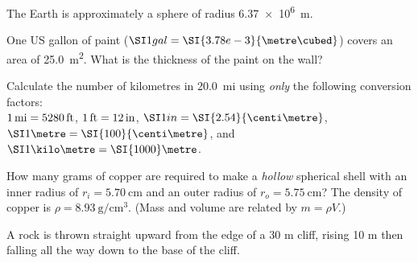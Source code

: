 \documentclass[12pt]{../ossphysics}
\begin{document}
\begin{questions}
  \question The Earth is approximately a sphere of radius \SI{6.37e6}\metre.
  
  \question One US gallon of paint ($\SI1{gal}=\SI{3.78e-3}{\metre\cubed}$)
  covers an area of \SI{25.0}{\metre\squared}. What is the thickness of the
  paint on the wall?
  \vspace{\stretch1}
  
  \question Calculate the number of kilometres in \SI{20.0}{mi} using
  \emph{only} the following conversion factors:\\ $\SI1{mi}=\SI{5280}{ft}$,
  $\SI1{ft}=\SI{12}{in}$, $\SI1{in}=\SI{2.54}{\centi\metre}$,
  $\SI1\metre=\SI{100}{\centi\metre}$, and $\SI1{\kilo\metre}=\SI{1000}\metre$.

  \question How many grams of copper are required to make a \emph{hollow}
  spherical shell with an inner radius of $r_i=\SI{5.70}{\centi\metre}$ and an
  outer radius of $r_o=\SI{5.75}{\centi\metre}$? The density of copper is
  $\rho=\SI{8.93}{\gram\per\centi\metre\cubed}$. (Mass and volume are related
  by $m=\rho V$.)
  \vspace{\stretch3}
  \newpage
  
  \question A rock is thrown straight upward from the edge of a 30 m cliff,
  rising 10 m then falling all the way down to the base of the cliff.
\end{questions}
\end{document}
